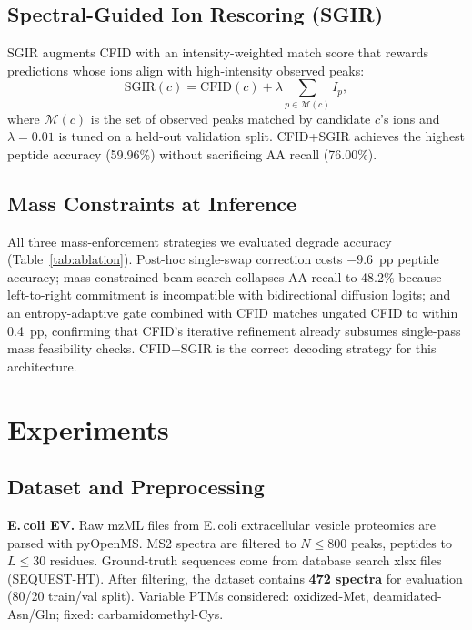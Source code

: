 \documentclass{article}
\begin{document}
\subsection{Spectral-Guided Ion Rescoring (SGIR)}

SGIR augments CFID with an intensity-weighted match score that rewards predictions whose ions
align with high-intensity observed peaks:
\begin{equation}
  \text{SGIR}(c) = \text{CFID}(c) + \lambda \sum_{p \in \mathcal{M}(c)} I_p,
  \label{eq:sgir}
\end{equation}
where $\mathcal{M}(c)$ is the set of observed peaks matched by candidate $c$'s ions and
$\lambda\!=\!0.01$ is tuned on a held-out validation split.
CFID+SGIR achieves the highest peptide accuracy (59.96\%) without sacrificing AA recall (76.00\%).

\subsection{Mass Constraints at Inference}

All three mass-enforcement strategies we evaluated degrade accuracy (Table~\ref{tab:ablation}).
Post-hoc single-swap correction costs $-9.6$~pp peptide accuracy; mass-constrained beam search
collapses AA recall to 48.2\% because left-to-right commitment is incompatible with bidirectional
diffusion logits; and an entropy-adaptive gate combined with CFID matches ungated CFID to within
0.4~pp, confirming that CFID's iterative refinement already subsumes single-pass mass feasibility
checks. CFID+SGIR is the correct decoding strategy for this architecture.

\section{Experiments}

\subsection{Dataset and Preprocessing}

\textbf{E.\,coli EV.} Raw mzML files from E.\,coli extracellular vesicle proteomics are
parsed with pyOpenMS.
MS2 spectra are filtered to $N \leq 800$ peaks, peptides to $L \leq 30$ residues.
Ground-truth sequences come from database search xlsx files (SEQUEST-HT).
After filtering, the dataset contains \textbf{472 spectra} for evaluation (80/20 train/val split).
Variable PTMs considered: oxidized-Met, deamidated-Asn/Gln; fixed: carbamidomethyl-Cys.
\end{document}
